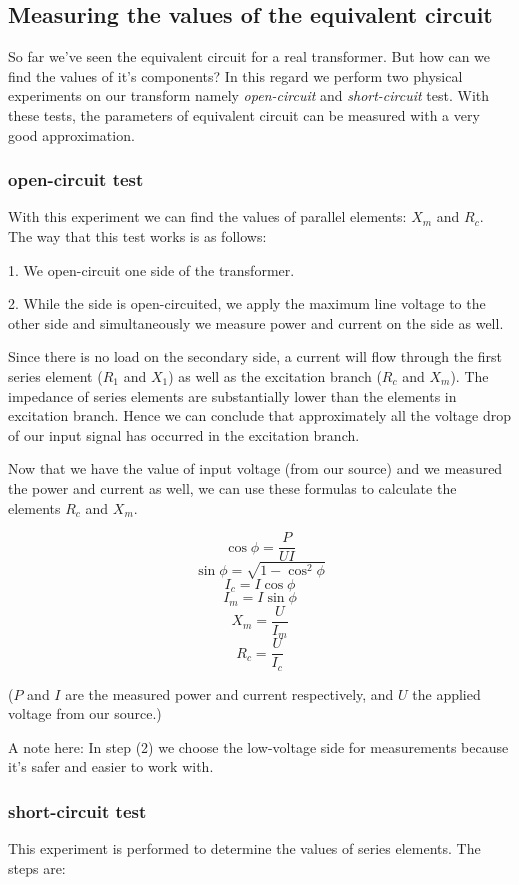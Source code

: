\documentclass{article}
\begin{document}
	\subsection{Measuring the values of the equivalent circuit}
	So far we've seen the equivalent circuit for a real transformer. 
	But how can we find the values of it's components? In this regard we perform two physical experiments on our transform namely \textit{open-circuit} and \textit{short-circuit} test. 
	With these tests, the parameters of equivalent circuit can be measured with a very good approximation.
	
	\subsubsection{open-circuit test}
	With this experiment we can find the values of parallel elements: $X_m$ and $R_c$. The way that this test works is as follows:

	1. We open-circuit one side of the transformer.
	
	2. While the side is open-circuited, we apply the maximum line voltage to the other side and simultaneously we measure power and current on the side as well.

	Since there is no load on the secondary side, a current will flow through the first series element ($R_1$ and $X_1$) as well as the excitation branch ($R_c$ and $X_m$). 
	The impedance of series elements are substantially lower than the elements in excitation branch.
	Hence we can conclude that approximately all the voltage drop of our input signal has occurred in the excitation branch.
		
	Now that we have the value of input voltage (from our source) and we measured the power and current as well, we can use these formulas to calculate the elements $R_c$ and $X_m$.
	
	$$ \cos \phi = \frac{P}{U I} $$
	$$ \sin \phi = \sqrt{1 - \cos^2 \phi}$$
	$$I_c = I \cos \phi $$
	$$I_m = I \sin \phi $$
	$$X_m = \frac{U}{I_m} $$
	$$R_c = \frac{U}{I_c}$$
	
	($P$ and $I$ are the measured power and current respectively, and $U$ the applied voltage from our source.)
	
	A note here: In step (2) we choose the low-voltage side for measurements because it's safer and easier to work with.
	\subsubsection{short-circuit test}
	This experiment is performed to determine the values of series elements. 
	The steps are:
\end{document}
